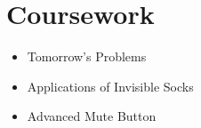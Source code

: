 \section{Coursework}
  \vspace{-10pt} %
  \begin{multicols}{3}
    \begin{itemize}[label=\textbf{$\bullet$}]
      \setlength{\itemsep}{-0.5em} %
      \setlength{\itemindent}{-0.5em} %
      \item{Tomorrow's Problems}
      \item{Applications of Invisible Socks}
      \item{Advanced Mute Button}
    \end{itemize}
  \end{multicols}

